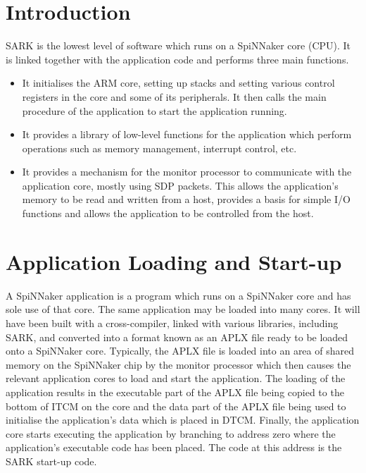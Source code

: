 
\def\FullTitle{SARK - SpiNNaker Application Runtime Kernel}
\def\ShortTitle{SARK 2.0.0}
\def\Date{8 Mar 2016}
\def\Version{2.0.0}
\def\Author{Steve Temple}
\def\Email{steven.temple@manchester.ac.uk}




\section{Introduction}

SARK is the lowest level of software which runs on a SpiNNaker core
(CPU). It is linked together with the application code and performs
three main functions.

\begin{itemize}
\item
It initialises the ARM core, setting up stacks and setting various
control registers in the core and some of its peripherals. It then
calls the main procedure of the application to start the application
running.

\item
It provides a library of low-level functions for the application
which perform operations such as memory management, interrupt control,
etc.

\item
It provides a mechanism for the monitor processor to communicate with
the application core, mostly using SDP packets. This allows the
application's memory to be read and written from a host, provides a
basis for simple I/O functions and allows the application to be
controlled from the host.
\end{itemize}

\section{Application Loading and Start-up}

A SpiNNaker application is a program which runs on a SpiNNaker core
and has sole use of that core. The same application may be loaded into
many cores. It will have been built with a cross-compiler, linked with
various libraries, including SARK, and converted into a format known
as an APLX file ready to be loaded onto a SpiNNaker core. Typically,
the APLX file is loaded into an area of shared memory on the SpiNNaker
chip by the monitor processor which then causes the relevant
application cores to load and start the application. The loading of
the application results in the executable part of the APLX file being
copied to the bottom of ITCM on the core and the data part of the APLX
file being used to initialise the application's data which is placed
in DTCM. Finally, the application core starts executing the
application by branching to address zero where the application's
executable code has been placed. The code at this address is the SARK
start-up code.

